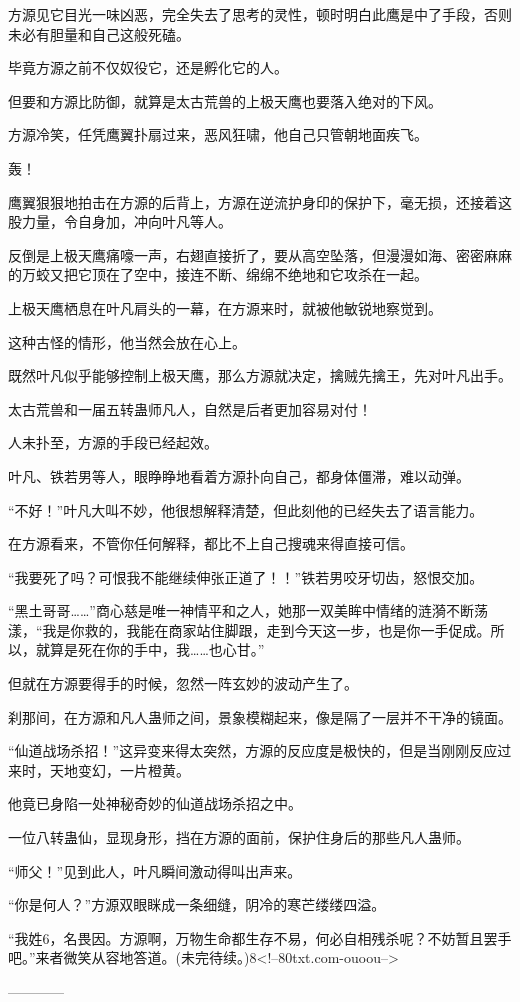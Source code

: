 \begin{this_body}
方源见它目光一味凶恶，完全失去了思考的灵性，顿时明白此鹰是中了手段，否则未必有胆量和自己这般死磕。

毕竟方源之前不仅奴役它，还是孵化它的人。

但要和方源比防御，就算是太古荒兽的上极天鹰也要落入绝对的下风。

方源冷笑，任凭鹰翼扑扇过来，恶风狂啸，他自己只管朝地面疾飞。

轰！

鹰翼狠狠地拍击在方源的后背上，方源在逆流护身印的保护下，毫无损，还接着这股力量，令自身加，冲向叶凡等人。

反倒是上极天鹰痛嚎一声，右翅直接折了，要从高空坠落，但漫漫如海、密密麻麻的万蛟又把它顶在了空中，接连不断、绵绵不绝地和它攻杀在一起。

上极天鹰栖息在叶凡肩头的一幕，在方源来时，就被他敏锐地察觉到。

这种古怪的情形，他当然会放在心上。

既然叶凡似乎能够控制上极天鹰，那么方源就决定，擒贼先擒王，先对叶凡出手。

太古荒兽和一届五转蛊师凡人，自然是后者更加容易对付！

人未扑至，方源的手段已经起效。

叶凡、铁若男等人，眼睁睁地看着方源扑向自己，都身体僵滞，难以动弹。

“不好！”叶凡大叫不妙，他很想解释清楚，但此刻他的已经失去了语言能力。

在方源看来，不管你任何解释，都比不上自己搜魂来得直接可信。

“我要死了吗？可恨我不能继续伸张正道了！！”铁若男咬牙切齿，怒恨交加。

“黑土哥哥……”商心慈是唯一神情平和之人，她那一双美眸中情绪的涟漪不断荡漾，“我是你救的，我能在商家站住脚跟，走到今天这一步，也是你一手促成。所以，就算是死在你的手中，我……也心甘。”

但就在方源要得手的时候，忽然一阵玄妙的波动产生了。

刹那间，在方源和凡人蛊师之间，景象模糊起来，像是隔了一层并不干净的镜面。

“仙道战场杀招！”这异变来得太突然，方源的反应度是极快的，但是当刚刚反应过来时，天地变幻，一片橙黄。

他竟已身陷一处神秘奇妙的仙道战场杀招之中。

一位八转蛊仙，显现身形，挡在方源的面前，保护住身后的那些凡人蛊师。

“师父！”见到此人，叶凡瞬间激动得叫出声来。

“你是何人？”方源双眼眯成一条细缝，阴冷的寒芒缕缕四溢。

“我姓6，名畏因。方源啊，万物生命都生存不易，何必自相残杀呢？不妨暂且罢手吧。”来者微笑从容地答道。(未完待续。)8<!--80txt.com-ouoou-->

------------

\end{this_body}

